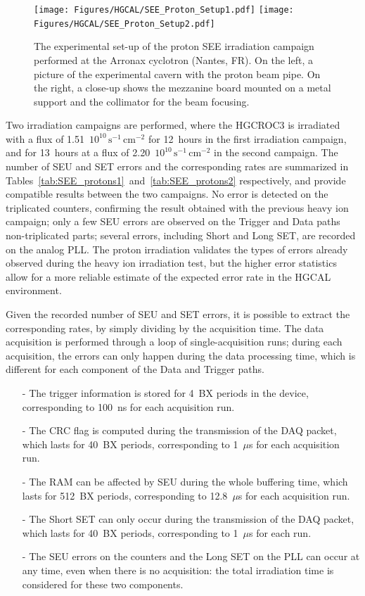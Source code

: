 \begin{figure}
    \centering
    \texttt{[image: Figures/HGCAL/SEE\_Proton\_Setup1.pdf]}
    \texttt{[image: Figures/HGCAL/SEE\_Proton\_Setup2.pdf]}
    \caption{The experimental set-up of the proton SEE irradiation campaign performed at the Arronax cyclotron (Nantes, FR). On the left, a picture of the experimental cavern with the proton beam pipe. On the right, a close-up shows the mezzanine board mounted on a metal support and the collimator for the beam focusing.}
    \label{fig:SEE_Proton_Setup}
\end{figure}

Two irradiation campaigns are performed, where the HGCROC3 is irradiated with a flux of 1.51~$10^{10}\,\textrm{s}^{-1}\,\textrm{cm}^{-2}$ for 12~hours in the first irradiation campaign, and for 13~hours at a flux of 2.20~$10^{10}\,\textrm{s}^{-1}\,\textrm{cm}^{-2}$ in the second campaign.
The number of SEU and SET errors and the corresponding rates are summarized in Tables~\ref{tab:SEE_protons1}~and~\ref{tab:SEE_protons2} respectively, and provide compatible results between the two campaigns.
No error is detected on the triplicated counters, confirming the result obtained with the previous heavy ion campaign; only a few SEU errors are observed on the Trigger and Data paths non-triplicated parts; several errors, including Short and Long SET, are recorded on the analog PLL. The proton irradiation validates the types of errors already observed during the heavy ion irradiation test, but the higher error statistics allow for a more reliable estimate of the expected error rate in the HGCAL environment.

\bigbreak

Given the recorded number of SEU and SET errors, it is possible to extract the corresponding rates, by simply dividing by the acquisition time. 
The data acquisition is performed through a loop of single-acquisition runs; during each acquisition, the errors can only happen during the data processing time, which is different for each component of the Data and Trigger paths.
\begin{itemize}
    \item [-] The trigger information is stored for 4~BX periods in the device, corresponding to 100~ns for each acquisition run.
    \item [-] The CRC flag is computed during the transmission of the DAQ packet, which lasts for 40~BX periods, corresponding to 1~$\mu$s for each acquisition run.
    \item [-] The RAM can be affected by SEU during the whole buffering time, which lasts for 512~BX periods, corresponding to 12.8~$\mu$s for each acquisition run.
    \item [-] The Short SET can only occur during the transmission of the DAQ packet, which lasts for 40~BX periods, corresponding to 1~$\mu$s for each run.
    \item [-] The SEU errors on the counters and the Long SET on the PLL can occur at any time, even when there is no acquisition: the total irradiation time is considered for these two components.
\end{itemize}

